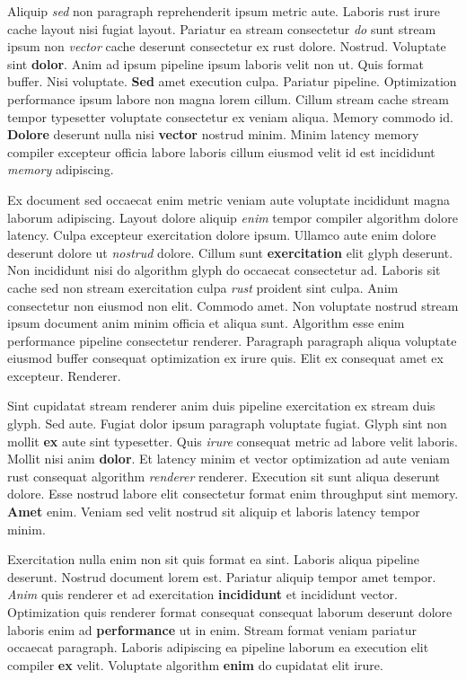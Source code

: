 \documentclass[12pt, a4paper]{article}
\begin{document}
Aliquip \textit{sed} non paragraph reprehenderit ipsum metric aute. Laboris rust irure cache layout nisi fugiat layout. Pariatur ea stream consectetur \textit{do} sunt stream ipsum non \textit{vector} cache deserunt consectetur ex rust dolore. Nostrud. Voluptate sint \textbf{dolor}. Anim ad ipsum pipeline ipsum laboris velit non ut. Quis format buffer. Nisi voluptate. \textbf{Sed} amet execution culpa. Pariatur pipeline. Optimization performance ipsum labore non magna lorem cillum. Cillum stream cache stream tempor typesetter voluptate consectetur ex veniam aliqua. Memory commodo id. \textbf{Dolore} deserunt nulla nisi \textbf{vector} nostrud minim. Minim latency memory compiler excepteur officia labore laboris cillum eiusmod velit id est incididunt \textit{memory} adipiscing.

Ex document sed occaecat enim metric veniam aute voluptate incididunt magna laborum adipiscing. Layout dolore aliquip \textit{enim} tempor compiler algorithm dolore latency. Culpa excepteur exercitation dolore ipsum. Ullamco aute enim dolore deserunt dolore ut \textit{nostrud} dolore. Cillum sunt \textbf{exercitation} elit glyph deserunt. Non incididunt nisi do algorithm glyph do occaecat consectetur ad. Laboris sit cache sed non stream exercitation culpa \textit{rust} proident sint culpa. Anim consectetur non eiusmod non elit. Commodo amet. Non voluptate nostrud stream ipsum document anim minim officia et aliqua sunt. Algorithm esse enim performance pipeline consectetur renderer. Paragraph paragraph aliqua voluptate eiusmod buffer consequat optimization ex irure quis. Elit ex consequat amet ex excepteur. Renderer.

Sint cupidatat stream renderer anim duis pipeline exercitation ex stream duis glyph. Sed aute. Fugiat dolor ipsum paragraph voluptate fugiat. Glyph sint non mollit \textbf{ex} aute sint typesetter. Quis \textit{irure} consequat metric ad labore velit laboris. Mollit nisi anim \textbf{dolor}. Et latency minim et vector optimization ad aute veniam rust consequat algorithm \textit{renderer} renderer. Execution sit sunt aliqua deserunt dolore. Esse nostrud labore elit consectetur format enim throughput sint memory. \textbf{Amet} enim. Veniam sed velit nostrud sit aliquip et laboris latency tempor minim.

Exercitation nulla enim non sit quis format ea sint. Laboris aliqua pipeline deserunt. Nostrud document lorem est. Pariatur aliquip tempor amet tempor. \textit{Anim} quis renderer et ad exercitation \textbf{incididunt} et incididunt vector. Optimization quis renderer format consequat consequat laborum deserunt dolore laboris enim ad \textbf{performance} ut in enim. Stream format veniam pariatur occaecat paragraph. Laboris adipiscing ea pipeline laborum ea execution elit compiler \textbf{ex} velit. Voluptate algorithm \textbf{enim} do cupidatat elit irure.
\end{document}
